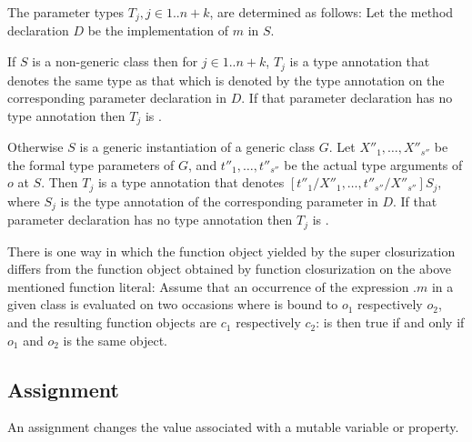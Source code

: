 \documentclass{article}
\begin{document}


\LMHash{}
The parameter types $T_j, j \in 1 .. n+k$, are determined as follows:
Let the method declaration $D$ be the implementation of $m$ in $S$.

\LMHash{}
If $S$ is a non-generic class then for $j \in 1 .. n+k$,
$T_j$ is a type annotation that denotes the same type as that which is denoted by the type annotation on the corresponding parameter declaration in $D$.
If that parameter declaration has no type annotation then $T_j$ is \DYNAMIC{}.

\LMHash{}
Otherwise $S$ is a generic instantiation of a generic class $G$.
Let $X''_1, \ldots, X''_{s''}$ be the formal type parameters of $G$,
and $t''_1, \ldots, t''_{s''}$ be the actual type arguments of $o$ at $S$.
Then $T_j$ is a type annotation that denotes $[t''_1/X''_1, \ldots, t''_{s''}/X''_{s''}]S_j$,
where $S_j$ is the type annotation of the corresponding parameter in $D$.
If that parameter declaration has no type annotation then $T_j$ is \DYNAMIC{}.

\LMHash{}
There is one way in which
the function object yielded by the super closurization differs from
the function object obtained by function closurization on the above mentioned function literal:
Assume that an occurrence of the expression \SUPER{}.$m$ in a given class
is evaluated on two occasions where \THIS{} is bound to $o_1$ respectively $o_2$,
and the resulting function objects are $c_1$ respectively $c_2$:
 is then true if and only if $o_1$ and $o_2$ is the same object.


\subsection{Assignment}

\LMHash{}
An assignment changes the value associated with a mutable variable or property.
\end{document}
